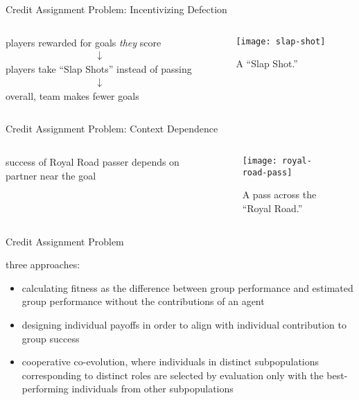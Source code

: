 \begin{frame}{Credit Assignment Problem: Incentivizing Defection}

\begin{columns}
\begin{column}{0.5\textwidth}
{\Large
players rewarded for goals \textit{they} score
\begin{align*}
\bm{\downarrow}
\end{align*}
players take ``Slap Shots'' instead of passing
\begin{align*}
\bm{\downarrow}
\end{align*}
overall, team makes fewer goals
}
\end{column}
\begin{column}{0.5\textwidth}
\begin{figure}
\texttt{[image: slap-shot]}
\caption{
A ``Slap Shot.''
}
\label{fig:slap-shot}
\end{figure}
\end{column}
\end{columns}

\end{frame}

\begin{frame}{Credit Assignment Problem: Context Dependence}

\begin{columns}
\begin{column}{0.5\textwidth}
\Large
success of Royal Road passer depends on partner near the goal
\end{column}
\begin{column}{0.5\textwidth}
\begin{figure}
\texttt{[image: royal-road-pass]}
\caption{
A pass across the ``Royal Road.''
}
\label{fig:royal-road-pass}
\end{figure}
\end{column}
\end{columns}


\end{frame}


\begin{frame}{Credit Assignment Problem}

three approaches:
\begin{itemize}
\item calculating fitness as the difference between group performance and estimated group performance without the contributions of an agent \cite{knudson2010coevolution}
\item designing individual payoffs in order to align with individual contribution to group success \cite{waibel2009genetic}
\item cooperative co-evolution, where individuals in distinct subpopulations corresponding to distinct roles are selected by evaluation only with the best-performing individuals from other subpopulations \cite{gomes2015cooperative}
\end{itemize}

\end{frame}
